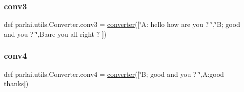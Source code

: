 \mbox{\label{namespaceparlai_1_1utils_1_1Converter_a2f2206cd164b65b49761dd286d53b1c7}} 
\subsubsection{\texorpdfstring{conv3}{conv3}}
{\footnotesize\ttfamily def parlai.\+utils.\+Converter.\+conv3 = \hyperlink{namespaceparlai_1_1utils_1_1Converter_abd079f987382596057ec8c630fa3db8c}{converter}(\mbox{[}\char`\"{}A\+: hello how are you ? \char`\"{},\char`\"{}B; good and you ? \char`\"{},\textquotesingle{}B\+:are you all right ? \textquotesingle{}\mbox{]})}

\mbox{\label{namespaceparlai_1_1utils_1_1Converter_a7d751305c00c3e74467fe993c35112c5}} 
\subsubsection{\texorpdfstring{conv4}{conv4}}
{\footnotesize\ttfamily def parlai.\+utils.\+Converter.\+conv4 = \hyperlink{namespaceparlai_1_1utils_1_1Converter_abd079f987382596057ec8c630fa3db8c}{converter}(\mbox{[}\char`\"{}B; good and you ? \char`\"{},\textquotesingle{}A\+:good thanks\textquotesingle{}\mbox{]})}

